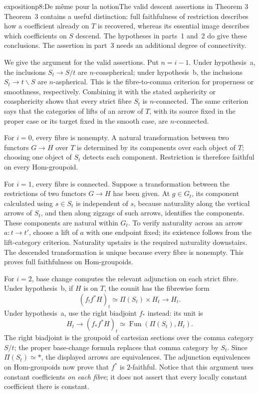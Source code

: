 \begin{dcomment}{exposition}{p8:De même pour la notion}{The valid descent assertions in Theorem 3}
Theorem~3 contains a useful distinction: full faithfulness of restriction describes how a coefficient already on $T$ is recovered, whereas its essential image describes which coefficients on $S$ descend. The hypotheses in parts~1 and~2 do give these conclusions. The assertion in part~3 needs an additional degree of connectivity.

We give the argument for the valid assertions. Put $n=i-1$. Under hypothesis~a, the inclusions $S_t\to S/t$ are $n$-coaspherical; under hypothesis~b, the inclusions $S_t\to t\backslash S$ are $n$-aspherical. This is the fibre-to-comma criterion for properness or smoothness, respectively. Combining it with the stated asphericity or coasphericity shows that every strict fibre $S_t$ is $n$-connected. The same criterion says that the categories of lifts of an arrow of $T$, with its source fixed in the proper case or its target fixed in the smooth case, are $n$-connected.

For $i=0$, every fibre is nonempty. A natural transformation between two functors $G\to H$ over $T$ is determined by its components over each object of $T$; choosing one object of $S_t$ detects each component. Restriction is therefore faithful on every Hom-groupoid.

For $i=1$, every fibre is connected. Suppose a transformation between the restrictions of two functors $G\to H$ has been given. At $g\in G_t$, its component calculated using $s\in S_t$ is independent of $s$, because naturality along the vertical arrows of $S_t$, and then along zigzags of such arrows, identifies the components. These components are natural within $G_t$. To verify naturality across an arrow $a:t\to t'$, choose a lift of $a$ with one endpoint fixed; its existence follows from the lift-category criterion. Naturality upstairs is the required naturality downstairs. The descended transformation is unique because every fibre is nonempty. This proves full faithfulness on Hom-groupoids.

For $i=2$, base change computes the relevant adjunction on each strict fibre. Under hypothesis~b, if $H$ is on $T$, the counit has the fibrewise form
\[
 (f_!f^*H)_t\simeq\Pi(S_t)\times H_t
 \longrightarrow H_t.
\]
Under hypothesis~a, use the right biadjoint $f_*$ instead: its unit is
\[
 H_t\longrightarrow(f_*f^*H)_t
 \simeq\operatorname{Fun}(\Pi(S_t),H_t).
\]
The right biadjoint is the groupoid of cartesian sections over the comma category $S/t$; the proper base-change formula replaces that comma category by $S_t$. Since $\Pi(S_t)\simeq*$, the displayed arrows are equivalences. The adjunction equivalences on Hom-groupoids now prove that $f^*$ is $2$-faithful. Notice that this argument uses constant coefficients \emph{on each fibre}; it does not assert that every locally constant coefficient there is constant.


\end{dcomment}

